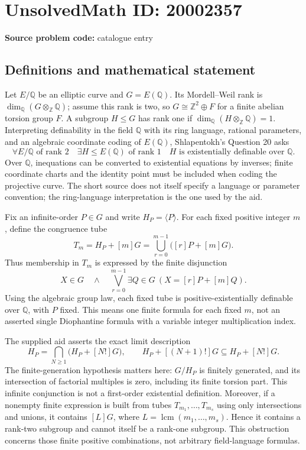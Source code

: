 \documentclass[11pt]{article}
\newcommand{\Z}{\mathbb{Z}}
\newcommand{\Q}{\mathbb{Q}}
\begin{document}
\section*{UnsolvedMath ID: 20002357}
\textbf{Source problem code:} catalogue entry
\subsection{Definitions and mathematical statement}
Let \(E/\Q\) be an elliptic curve and \(G=E(\Q)\). Its Mordell--Weil rank is \(\dim_\Q(G\otimes_\Z\Q)\); assume this rank is two, so \(G\cong\Z^2\oplus F\) for a finite abelian torsion group \(F\). A subgroup \(H\le G\) has rank one if \(\dim_\Q(H\otimes_\Z\Q)=1\). Interpreting definability in the field \(\Q\) with its ring language, rational parameters, and an algebraic coordinate coding of \(E(\Q)\), Shlapentokh's Question 20 asks
\[
 \forall E/\Q\text{ of rank }2\quad
 \exists H\le E(\Q)\text{ of rank }1
 \quad H\text{ is existentially definable over }\Q.
\]
Over \(\Q\), inequations can be converted to existential equations by inverses; finite coordinate charts and the identity point must be included when coding the projective curve. The short source does not itself specify a language or parameter convention; the ring-language interpretation is the one used by the aid.

Fix an infinite-order \(P\in G\) and write \(H_P=\langle P\rangle\). For each fixed positive integer \(m\), define the congruence tube
\[
 T_m=H_P+[m]G
 =\bigcup_{r=0}^{m-1}\bigl([r]P+[m]G\bigr).
\]
Thus membership in \(T_m\) is expressed by the finite disjunction
\[
 X\in G\quad\wedge\quad
 \bigvee_{r=0}^{m-1}\exists Q\in G\ (X=[r]P+[m]Q).
\]
Using the algebraic group law, each fixed tube is positive-existentially definable over \(\Q\), with \(P\) fixed. This means one finite formula for each fixed \(m\), not an asserted single Diophantine formula with a variable integer multiplication index.

The supplied aid asserts the exact limit description
\[
 H_P=\bigcap_{N\ge1}\bigl(H_P+[N!]G\bigr),\qquad
 H_P+[(N+1)!]G\subseteq H_P+[N!]G.
\]
The finite-generation hypothesis matters here: \(G/H_P\) is finitely generated, and its intersection of factorial multiples is zero, including its finite torsion part. This infinite conjunction is not a first-order existential definition. Moreover, if a nonempty finite expression is built from tubes \(T_{m_1},\ldots,T_{m_s}\) using only intersections and unions, it contains \([L]G\), where \(L=\operatorname{lcm}(m_1,\ldots,m_s)\). Hence it contains a rank-two subgroup and cannot itself be a rank-one subgroup. This obstruction concerns those finite positive combinations, not arbitrary field-language formulas.
\end{document}

